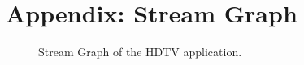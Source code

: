 \documentclass{article}
\begin{document}
\begin{small}


\end{small}


\section{Appendix: Stream Graph}

\begin{figure}
\center
\epsfxsize=5.5in
\caption{Stream Graph of the HDTV application.}
\label{fig:hdtv-stream-graph}
\end{figure}
\end{document}
